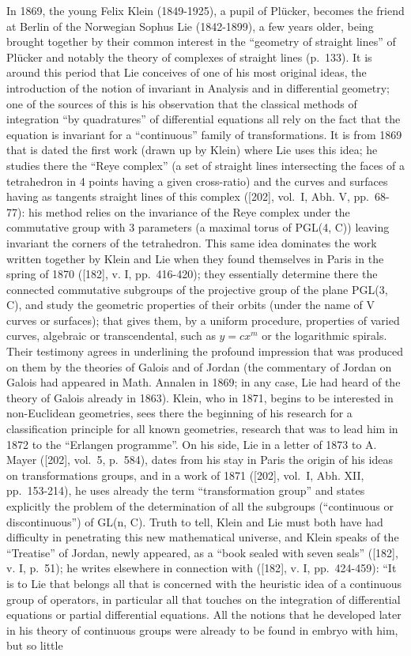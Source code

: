 In 1869, the young Felix Klein (1849-1925), a pupil of Plücker, becomes the friend at Berlin of the Norwegian Sophus Lie (1842-1899), a few years older, being brought together by their common interest in the ``geometry of straight lines'' of Plücker and notably the theory of complexes of straight lines (p.~133). It is around this period that Lie conceives of one of his most original ideas, the introduction of the notion of invariant in Analysis and in differential geometry; one of the sources of this is his observation that the classical methods of integration ``by quadratures'' of differential equations all rely on the fact that the equation is invariant for a ``continuous'' family of transformations. It is from 1869 that is dated the first work (drawn up by Klein) where Lie uses this idea; he studies there the ``Reye complex'' (a set of straight lines intersecting the faces of a tetrahedron in 4 points having a given cross-ratio) and the curves and surfaces having as tangents straight lines of this complex ({[}202{]}, vol.~I, Abh. V, pp.~68-77): his method relies on the invariance of the Reye complex under the commutative group with 3 parameters (a maximal torus of PGL(4, C)) leaving invariant the corners of the tetrahedron. This same idea dominates the work written together by Klein and Lie when they found themselves in Paris in the spring of 1870 ({[}182{]}, v. I, pp.~416-420); they essentially determine there the connected commutative subgroups of the projective group of the plane PGL(3, C), and study the geometric properties of their orbits (under the name of V curves or surfaces); that gives them, by a uniform procedure, properties of varied curves, algebraic or transcendental, such as \(y = cx^m\) or the logarithmic spirals. Their testimony agrees in underlining the profound impression that was produced on them by the theories of Galois and of Jordan (the commentary of Jordan on Galois had appeared in Math. Annalen in 1869; in any case, Lie had heard of the theory of Galois already in 1863). Klein, who in 1871, begins to be interested in non-Euclidean geometries, sees there the beginning of his research for a classification principle for all known geometries, research that was to lead him in 1872 to the ``Erlangen programme''. On his side, Lie in a letter of 1873 to A. Mayer ({[}202{]}, vol.~5, p.~584), dates from his stay in Paris the origin of his ideas on transformations groups, and in a work of 1871 ({[}202{]}, vol.~I, Abh. XII, pp.~153-214), he uses already the term ``transformation group'' and states explicitly the problem of the determination of all the subgroups (``continuous or discontinuous'') of GL(n, C). Truth to tell, Klein and Lie must both have had difficulty in penetrating this new mathematical universe, and Klein speaks of the ``Treatise'' of Jordan, newly appeared, as a ``book sealed with seven seals'' ({[}182{]}, v. I, p.~51); he writes elsewhere in connection with ({[}182{]}, v. I, pp.~424-459): ``It is to Lie that belongs all that is concerned with the heuristic idea of a continuous group of operators, in particular all that touches on the integration of differential equations or partial differential equations. All the notions that he developed later in his theory of continuous groups were already to be found in embryo with him, but so little 